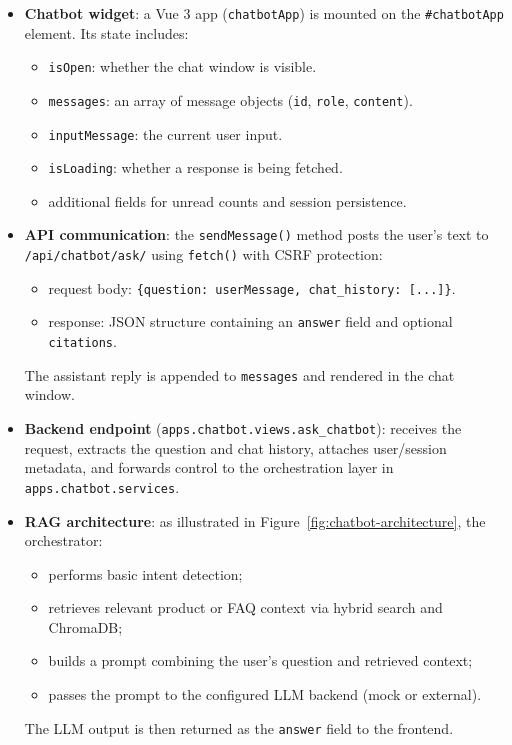 \begin{itemize}
  \item \textbf{Chatbot widget}: a Vue 3 app (\texttt{chatbotApp}) is mounted on the \texttt{\#chatbotApp} element. Its state includes:
  \begin{itemize}
    \item \texttt{isOpen}: whether the chat window is visible.
    \item \texttt{messages}: an array of message objects (\texttt{id}, \texttt{role}, \texttt{content}).
    \item \texttt{inputMessage}: the current user input.
    \item \texttt{isLoading}: whether a response is being fetched.
    \item additional fields for unread counts and session persistence.
  \end{itemize}
  \item \textbf{API communication}: the \texttt{sendMessage()} method posts the user’s text to \texttt{/api/chatbot/ask/} using \texttt{fetch()} with CSRF protection:
  \begin{itemize}
    \item request body: \texttt{\{question: userMessage, chat\_history: [...]\}}.
    \item response: JSON structure containing an \texttt{answer} field and optional \texttt{citations}.
  \end{itemize}
  The assistant reply is appended to \texttt{messages} and rendered in the chat window.
  \item \textbf{Backend endpoint} (\texttt{apps.chatbot.views.ask\_chatbot}): receives the request, extracts the question and chat history, attaches user/session metadata, and forwards control to the orchestration layer in \texttt{apps.chatbot.services}.
  \item \textbf{RAG architecture}: as illustrated in Figure~\ref{fig:chatbot-architecture}, the orchestrator:
  \begin{itemize}
    \item performs basic intent detection;
    \item retrieves relevant product or FAQ context via hybrid search and ChromaDB;
    \item builds a prompt combining the user’s question and retrieved context;
    \item passes the prompt to the configured LLM backend (mock or external).
  \end{itemize}
  The LLM output is then returned as the \texttt{answer} field to the frontend.
\end{itemize}

